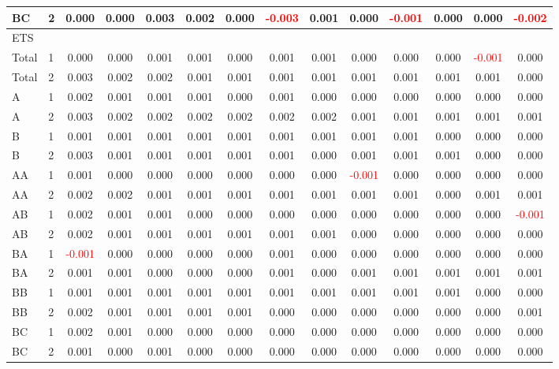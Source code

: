 \begin{table}[H]
{\begin{tabular}{llcccccccccccc}
BC & 2 & 0.000 & 0.000 & 0.003 & 0.002 & 0.000 & \textcolor{red}{-0.003} & 0.001 & 0.000 & \textcolor{red}{-0.001} & 0.000 & 0.000 & \textcolor{red}{-0.002}\\
\hline
ETS &  &  &  &  &  &  &  &  &  &  &  &  & \\
\hline
Total & 1 & 0.000 & 0.000 & 0.001 & 0.001 & 0.000 & 0.001 & 0.001 & 0.000 & 0.000 & 0.000 & \textcolor{red}{-0.001} & 0.000\\
Total & 2 & 0.003 & 0.002 & 0.002 & 0.001 & 0.001 & 0.001 & 0.001 & 0.001 & 0.001 & 0.001 & 0.001 & 0.000\\
A & 1 & 0.002 & 0.001 & 0.001 & 0.001 & 0.000 & 0.001 & 0.000 & 0.000 & 0.000 & 0.000 & 0.000 & 0.000\\
A & 2 & 0.003 & 0.002 & 0.002 & 0.002 & 0.002 & 0.002 & 0.002 & 0.001 & 0.001 & 0.001 & 0.001 & 0.001\\
B & 1 & 0.001 & 0.001 & 0.001 & 0.001 & 0.001 & 0.001 & 0.001 & 0.001 & 0.001 & 0.000 & 0.000 & 0.000\\
B & 2 & 0.003 & 0.001 & 0.001 & 0.001 & 0.001 & 0.001 & 0.000 & 0.001 & 0.001 & 0.001 & 0.000 & 0.000\\
AA & 1 & 0.001 & 0.000 & 0.000 & 0.000 & 0.000 & 0.000 & 0.000 & \textcolor{red}{-0.001} & 0.000 & 0.000 & 0.000 & 0.000\\
AA & 2 & 0.002 & 0.002 & 0.001 & 0.001 & 0.001 & 0.001 & 0.001 & 0.001 & 0.001 & 0.000 & 0.001 & 0.001\\
AB & 1 & 0.002 & 0.001 & 0.001 & 0.000 & 0.000 & 0.000 & 0.000 & 0.000 & 0.000 & 0.000 & 0.000 & \textcolor{red}{-0.001}\\
AB & 2 & 0.002 & 0.001 & 0.001 & 0.001 & 0.001 & 0.001 & 0.001 & 0.000 & 0.000 & 0.000 & 0.000 & 0.000\\
BA & 1 & \textcolor{red}{-0.001} & 0.000 & 0.000 & 0.000 & 0.000 & 0.001 & 0.000 & 0.000 & 0.000 & 0.000 & 0.000 & 0.000\\
BA & 2 & 0.001 & 0.001 & 0.000 & 0.000 & 0.000 & 0.001 & 0.000 & 0.001 & 0.001 & 0.001 & 0.001 & 0.001\\
BB & 1 & 0.001 & 0.001 & 0.001 & 0.001 & 0.001 & 0.001 & 0.001 & 0.001 & 0.001 & 0.001 & 0.000 & 0.000\\
BB & 2 & 0.002 & 0.001 & 0.001 & 0.001 & 0.001 & 0.000 & 0.000 & 0.000 & 0.000 & 0.000 & 0.000 & 0.001\\
BC & 1 & 0.002 & 0.001 & 0.000 & 0.000 & 0.000 & 0.000 & 0.000 & 0.000 & 0.000 & 0.000 & 0.000 & 0.000\\
BC & 2 & 0.001 & 0.000 & 0.001 & 0.000 & 0.000 & 0.000 & 0.000 & 0.000 & 0.000 & 0.000 & 0.000 & 0.000\\

\end{tabular}}
\end{table}
